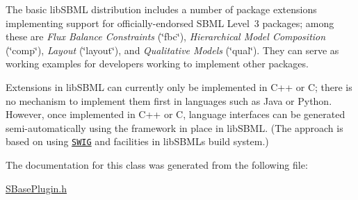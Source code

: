 The basic lib\+S\+B\+ML distribution includes a number of package extensions implementing support for officially-\/endorsed S\+B\+ML Level~3 packages; among these are {\itshape Flux Balance Constraints} (\char`\"{}fbc\char`\"{}), {\itshape Hierarchical Model Composition} (\char`\"{}comp\char`\"{}), {\itshape Layout} (\char`\"{}layout\char`\"{}), and {\itshape Qualitative Models} (\char`\"{}qual\char`\"{}). They can serve as working examples for developers working to implement other packages.

Extensions in lib\+S\+B\+ML can currently only be implemented in C++ or C; there is no mechanism to implement them first in languages such as Java or Python. However, once implemented in C++ or C, language interfaces can be generated semi-\/automatically using the framework in place in lib\+S\+B\+ML. (The approach is based on using \href{http://www.swig.org}{\tt S\+W\+IG} and facilities in lib\+S\+B\+ML\textquotesingle{}s build system.) 

The documentation for this class was generated from the following file\+:\begin{DoxyCompactItemize}
\item 
\hyperlink{_s_base_plugin_8h}{S\+Base\+Plugin.\+h}\end{DoxyCompactItemize}

